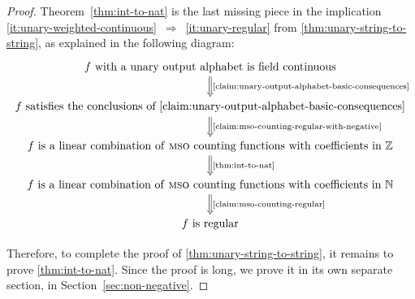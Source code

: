 \begin{proof}
Theorem~\ref{thm:int-to-nat} is the last missing piece in the  implication \ref{it:unary-weighted-continuous}~$\Rightarrow$~\ref{it:unary-regular} from \cref{thm:unary-string-to-string}, as explained in the following diagram: 
\[
\begin{tikzcd}
\text{$f$ with a unary output alphabet is field continuous}
\arrow[d, Rightarrow, "\text{\cref{claim:unary-output-alphabet-basic-consequences}}"]\\
\text{$f$ satisfies the conclusions of \cref{claim:unary-output-alphabet-basic-consequences}}
\arrow[d, Rightarrow, "\text{\cref{claim:mso-counting-regular-with-negative}}"] \\
\text{$f$ is a linear combination of \mso counting functions with  coefficients in $\Int$}
\arrow[d, Rightarrow, "\text{\cref{thm:int-to-nat}}"] \\
\text{$f$ is a linear combination of \mso counting functions with  coefficients in $\Nat$}
\arrow[d, Rightarrow, "\text{\cref{claim:mso-counting-regular}}"] \\
\text{$f$ is regular}
\end{tikzcd}
\]

Therefore, to complete the proof of \cref{thm:unary-string-to-string}, it remains to prove \cref{thm:int-to-nat}. Since the  proof  is long, we prove it in its own separate section,  in Section~\ref{sec:non-negative}.
\end{proof}

   

